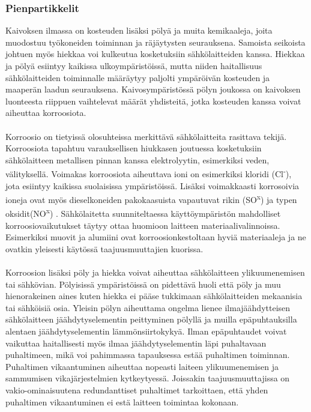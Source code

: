 \documentclass[finnish,12pt,a4paper,pdftex,elec,utf8]{aaltothesis}
\begin{document}
\subsubsection{Pienpartikkelit}
Kaivoksen ilmassa on kosteuden lisäksi pölyä ja muita kemikaaleja, joita muodostuu työkoneiden toiminnan ja räjäytysten seurauksena. Samoista seikoista johtuen myös hiekkaa voi kulkeutua kosketuksiin sähkölaitteiden kanssa. Hiekkaa ja pölyä esiintyy kaikissa ulkoympäristöissä, mutta niiden haitallisuus sähkölaitteiden toiminnalle määräytyy paljolti ympäröivän kosteuden ja maaperän laadun seurauksena. Kaivosympäristössä pölyn joukossa on kaivoksen luonteesta riippuen vaihtelevat määrät yhdisteitä, jotka kosteuden kanssa voivat aiheuttaa korroosiota.
\\\\
Korroosio on tietyissä olosuhteissa merkittävä sähkölaitteita rasittava tekijä. Korroosiota tapahtuu varauksellisen hiukkasen joutuessa kosketuksiin sähkölaitteen metallisen pinnan kanssa elektrolyytin, esimerkiksi veden, välityksellä. Voimakas korroosiota aiheuttava ioni on esimerkiksi kloridi (Cl\textsuperscript{-}), jota esiintyy kaikissa suolaisissa ympäristöissä. Lisäksi voimakkaasti korrosoivia ioneja ovat myös dieselkoneiden pakokaasuista vapautuvat rikin (SO\textsuperscript{x}) ja typen oksidit(NO\textsuperscript{x}) \cite[s. 290]{Hakapää}. Sähkölaitetta suunniteltaessa käyttöympäristön mahdolliset korroosiovaikutukset täytyy ottaa huomioon laitteen materiaalivalinnoissa. Esimerkiksi muovit ja alumiini ovat korroosionkestoltaan hyviä materiaaleja ja ne ovatkin yleisesti käytössä taajuusmuuttajien kuorissa.
\\\\
Korroosion lisäksi pöly ja hiekka voivat aiheuttaa sähkölaitteen ylikuumenemisen tai sähkövian. Pölyisissä ympäristöissä on pidettävä huoli että pöly ja muu hienorakeinen aines kuten hiekka ei pääse tukkimaan sähkölaitteiden mekaanisia tai sähköisiä osia. Yleisin pölyn aiheuttama ongelma lienee ilmajäähdytteisen sähkölaitteen jäähdytyselementin peittyminen pölyllä ja muilla epäpuhtauksilla alentaen jäähdytyselementin lämmönsiirtokykyä. Ilman epäpuhtaudet voivat vaikuttaa haitallisesti myös ilmaa jäähdytyselementin läpi puhaltavaan puhaltimeen, mikä voi pahimmassa tapauksessa estää puhaltimen toiminnan.\cite{Pallasmaa} Puhaltimen vikaantuminen aiheuttaa nopeasti laiteen ylikuumenemisen ja sammumisen vikajärjestelmien kytkeytyessä. Joissakin taajuusmuuttajissa on vakio-ominaisuutena redundanttiset puhaltimet tarkoittaen, että yhden puhaltimen vikaantuminen ei estä laitteen toimintaa kokonaan.
\end{document}
